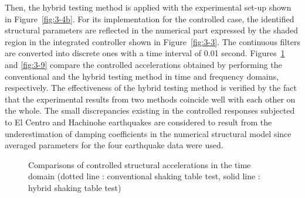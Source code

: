 Then, the hybrid testing method is applied with the experimental set-up shown in Figure~\ref{fig:3-4b}. For its implementation for the controlled case, the identified structural parameters are reflected in the numerical part expressed by the shaded region in the integrated controller shown in Figure~\ref{fig:3-3}. The continuous filters are converted into discrete ones with a time interval of 0.01 second. Figures~\ref{fig:3-8} and \ref{fig:3-9} compare the controlled accelerations obtained by performing the conventional and the hybrid testing method in time and frequency domains, respectively. The effectiveness of the hybrid testing method is verified by the fact that the experimental results from two methods coincide well with each other on the whole. The small discrepancies existing in the controlled responses subjected to El Centro and Hachinohe earthquakes are considered to result from the underestimation of damping coefficients in the numerical structural model since averaged parameters for the four earthquake data were used.

\begin{figure}[!ht]
\centering
\caption{Comparisons of controlled structural accelerations in the time domain
(dotted line : conventional shaking table test, solid line : hybrid shaking table test)
}
\label{fig:3-8}
\end{figure}

